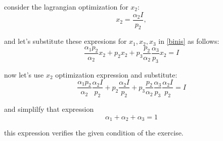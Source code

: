 \documentclass{article}
\begin{document}
consider the lagrangian optimization for $x_2$:
\begin{equation}
  x_2 = \frac{\alpha_2 I}{p_2},
\end{equation}

and let's substitute these expresions for $x_1, x_2, x_3$ in \ref{binis} as follows:
\begin{equation}
  \frac{ \alpha_1 p_2}{\alpha_2}x_2 + p_2x_2 + p_3\frac{p_2}{\alpha_2}\frac{\alpha_3}{p_3}x_2 = I
\end{equation}

now let's use $x_2$ optimization expression and substitute:
\begin{equation}
  \frac{ \alpha_1 p_2}{\alpha_2}\frac{\alpha_2 I}{p_2} + p_2\frac{\alpha_2 I}{p_2} + p_3\frac{p_2}{\alpha_2}\frac{\alpha_3}{p_3}\frac{\alpha_2 I}{p_2} = I
\end{equation}

and simplilfy that expression
\begin{equation}
  \alpha_1 + \alpha_2 + \alpha_3 = 1
\end{equation}

this expression verifies the given condition of the exercise.
\end{document}
